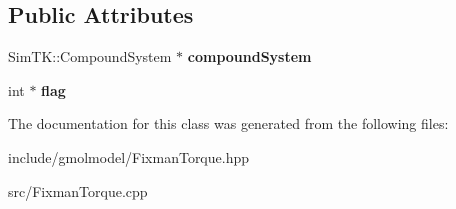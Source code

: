 \subsection*{Public Attributes}
\begin{DoxyCompactItemize}
\item 
Sim\+T\+K\+::\+Compound\+System $\ast$ {\bfseries compound\+System}\hypertarget{classFixmanTorque_ad14823bc66cdf8c9011b4244e25055a2}{}\label{classFixmanTorque_ad14823bc66cdf8c9011b4244e25055a2}

\item 
int $\ast$ {\bfseries flag}\hypertarget{classFixmanTorque_a79ebec738a8d217a768c485b619c8cba}{}\label{classFixmanTorque_a79ebec738a8d217a768c485b619c8cba}

\end{DoxyCompactItemize}


The documentation for this class was generated from the following files\+:\begin{DoxyCompactItemize}
\item 
include/gmolmodel/Fixman\+Torque.\+hpp\item 
src/Fixman\+Torque.\+cpp\end{DoxyCompactItemize}
